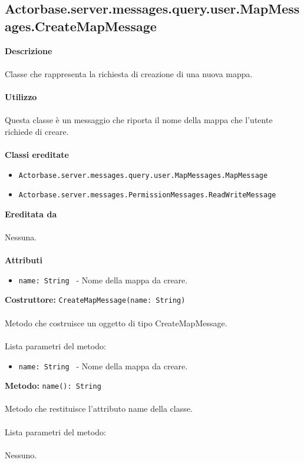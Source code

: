 \documentclass[a4paper]{article}
\begin{document}
	\subsection{Actorbase.server.messages.query.user.MapMessages.CreateMapMessage}
		\textbf{Descrizione}
			\\ \\
		Classe che rappresenta la richiesta di creazione di una nuova mappa.
			\\ \\
		\textbf{Utilizzo}
			\\ \\
		Questa classe è un messaggio che riporta il nome della mappa che l'utente richiede di creare.
			\\ \\
		\textbf{Classi ereditate}
			\begin{itemize}
				\item \texttt{Actorbase.server.messages.query.user.MapMessages.MapMessage }
				\item \texttt{Actorbase.server.messages.PermissionMessages.ReadWriteMessage }
			\end{itemize}
		\textbf{Ereditata da}
			\\ \\
			Nessuna.
			\\ \\
		\textbf{Attributi}
			\begin{itemize}
				\item \texttt{name: String } - Nome della mappa da creare.
			\end{itemize}
		\textbf{Costruttore: }\texttt{CreateMapMessage(name: String)}
			\\ \\
		Metodo che costruisce un oggetto di tipo CreateMapMessage.
			\\ \\
		Lista parametri del metodo:
			\begin{itemize}
				\item \texttt{name: String } - Nome della mappa da creare.
			\end{itemize}
		\textbf{Metodo: }\texttt{name(): String}
			\\ \\
		Metodo che restituisce l'attributo name della classe.
			\\ \\
		Lista parametri del metodo:
			\\ \\
			Nessuno.
			
\end{document}

